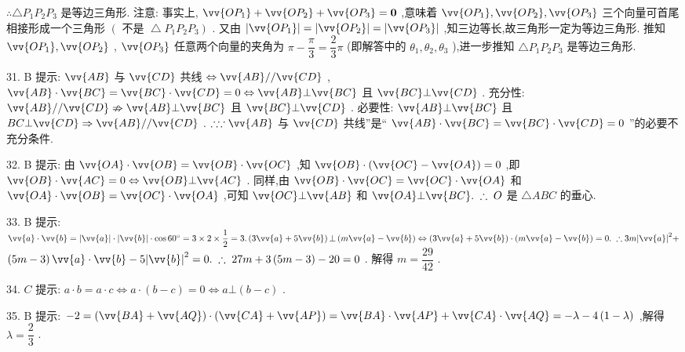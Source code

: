 $\therefore \bigtriangleup {P}_{1}{P}_{2}{P}_{3}$ 是等边三角形. 注意: 事实上, $\vv{O{P}_{1}} + \vv{O{P}_{2}} + \vv{O{P}_{3}} = \mathbf{0}$ ,意味着 $\vv{O{P}_{1}},\vv{O{P}_{2}},\vv{O{P}_{3}}$ 三个向量可首尾相接形成一个三角形 $\left( {\text{ 不是 }\bigtriangleup {P}_{1}{P}_{2}{P}_{3}}\right)$ . 又由 $\left| \vv{O{P}_{1}}\right|  = \left| \vv{O{P}_{2}}\right|  = \left| \vv{O{P}_{3}}\right|$ ,知三边等长,故三角形一定为等边三角形. 推知 $\vv{O{P}_{1}},\vv{O{P}_{2}}$ , $\vv{O{P}_{3}}$ 任意两个向量的夹角为 $\pi  - \dfrac{\pi }{3} = \dfrac{2}{3}\pi$ (即解答中的 ${\theta }_{1},{\theta }_{2},{\theta }_{3}$ ),进一步推知 $\bigtriangleup {P}_{1}{P}_{2}{P}_{3}$ 是等边三角形.

31. B 提示: $\vv{AB}$ 与 $\vv{CD}$ 共线 $\Leftrightarrow  \vv{AB}//\vv{CD}$ , $\vv{AB} \cdot  \vv{BC} = \vv{BC} \cdot  \vv{CD} = 0 \Leftrightarrow  \vv{AB}\bot \vv{BC}$ 且 $\vv{BC}\bot \vv{CD}$ . 充分性: $\vv{AB}//\vv{CD} \nRightarrow  \vv{AB}\bot \vv{BC}$ 且 $\vv{BC}\bot \vv{CD}$ . 必要性: $\vv{AB}\bot \vv{BC}$ 且 ${BC}\bot \vv{CD} \Rightarrow  \vv{AB}//\vv{CD}$ . $\therefore \because \vv{AB}$ 与 $\vv{CD}$ 共线”是“ $\vv{AB} \cdot  \vv{BC} = \vv{BC} \cdot  \vv{CD} = 0$ ”的必要不充分条件.

32. B 提示: 由 $\vv{OA} \cdot  \vv{OB} = \vv{OB} \cdot  \vv{OC}$ ,知 $\vv{OB} \cdot  \left( {\vv{OC} - \vv{OA}}\right)  = 0$ ,即 $\vv{OB} \cdot  \vv{AC} = 0 \Leftrightarrow  \vv{OB}\bot \vv{AC}$ . 同样,由 $\vv{OB} \cdot  \vv{OC} = \vv{OC} \cdot  \vv{OA}$ 和 $\vv{OA} \cdot  \vv{OB} = \vv{OC} \cdot  \vv{OA}$ ,可知 $\vv{OC}\bot \vv{AB}$ 和 $\vv{OA}\bot \vv{BC}.\;\therefore \;O$ 是 $\bigtriangleup  {ABC}$ 的垂心.

33. B 提示: $\vv{a} \cdot  \vv{b} = \left| \vv{a}\right|  \cdot  \left| \vv{b}\right|  \cdot  \cos {60}^{ \circ  } = 3 \times  2 \times  \dfrac{1}{2} = 3.\left( {3\vv{a} + 5\vv{b}}\right)  \bot  \left( {m\vv{a} - \vv{b}}\right)  \Leftrightarrow  \left( {3\vv{a} + 5\vv{b}}\right)  \cdot  \left( {m\vv{a} - \vv{b}}\right)  = 0.\;\therefore {3m}{\left| \vv{a}\right| }^{2} +$  $\left( {{5m} - 3}\right) \vv{a} \cdot  \vv{b} - 5{\left| \vv{b}\right| }^{2} = 0.\;\therefore \;{27m} + 3\left( {{5m} - 3}\right)  - {20} = 0$ . 解得 $m = \dfrac{29}{42}$ .

34. $C$ 提示: $a \cdot  b = a \cdot  c \Leftrightarrow  a \cdot  \left( {b - c}\right)  = 0 \Leftrightarrow  a \bot  \left( {b - c}\right)$ .

35. B 提示: $- 2 = \left( {\vv{BA} + \vv{AQ}}\right)  \cdot  \left( {\vv{CA} + \vv{AP}}\right)  = \vv{BA} \cdot  \vv{AP} + \vv{CA} \cdot  \vv{AQ} =  - \lambda  - 4\left( {1 - \lambda }\right)$ ,解得 $\lambda  = \dfrac{2}{3}$ .

